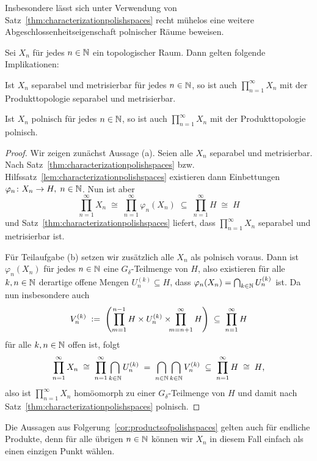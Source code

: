 \documentclass[../main/main.tex]{subfiles}
\begin{document}
	Insbesondere lässt sich unter Verwendung von Satz~\ref{thm:characterizationpolishspaces} recht mühelos eine weitere Abgeschlossenheitseigenschaft polnischer Räume beweisen.
	
	\begin{Folgerung}
		\label{cor:productsofpolishspaces}
		Sei $X_n$ für jedes $n \in \mathbb{N}$ ein topologischer Raum. Dann gelten folgende Implikationen:
		\begin{enumeratethm}
			\item Ist $X_n$ separabel und metrisierbar für jedes $n \in \mathbb{N}$, so ist auch $\prod_{n=1}^{\infty} X_n$ mit der Produkttopologie separabel und metrisierbar.
			\item Ist $X_n$ polnisch für jedes $n \in \mathbb{N}$, so ist auch $\prod_{n=1}^{\infty} X_n$ mit der Produkttopologie polnisch.
		\end{enumeratethm}
	\end{Folgerung}
	
	\begin{proof}
		Wir zeigen zunächst Aussage (a). Seien alle $X_n$ separabel und metrisierbar. Nach Satz~\ref{thm:characterizationpolishspaces} bzw. 
		Hilfssatz~\ref{lem:characterizationpolishspaces} existieren dann Einbettungen $\varphi_n \colon X_n \to H, \; n \in \mathbb{N}$. Nun ist aber 
		\[ \prod_{n=1}^{\infty} X_n \; \cong \; \prod_{n=1}^{\infty} \varphi_n(X_n) \; \subseteq \; \prod_{n=1}^{\infty} H \; \cong \; H \]
		und Satz~\ref{thm:characterizationpolishspaces} liefert, dass $\prod_{n=1}^{\infty} X_n$ separabel und metrisierbar ist.
		
		Für Teilaufgabe (b) setzen wir zusätzlich alle $X_n$ als polnisch voraus. Dann ist $\varphi_n(X_n)$ für jedes $n \in \mathbb{N}$ eine $G_{\delta}$-Teilmenge von $H$, also
		existieren für alle $k, n \in \mathbb{N}$ derartige offene Mengen $U_n^{(k)} \subseteq H$, dass $\varphi_n(X_n) = \bigcap_{k \in \mathbb{N}} U_n^{(k)}$ ist. Da nun insbesondere auch
		\[ V_n^{(k)} \; \vcentcolon = \; \left( \prod_{m=1}^{n-1} H \times U_n^{(k)} \times \!\!\! \prod_{m=n+1}^{\infty} H \right) \; \subseteq \; \prod_{n=1}^{\infty} H \]
		für alle $k, n \in \mathbb{N}$ offen ist, folgt
		\[ \prod_{n=1}^{\infty} X_n \; \cong \; \prod_{n=1}^{\infty} \bigcap_{k \in \mathbb{N}} U_n^{(k)} \; = \; \bigcap_{n \in \mathbb{N}} \bigcap_{k \in \mathbb{N}} V_n^{(k)} \; \subseteq \; \prod_{n=1}^{\infty} H \; \cong \; H \text{,} \]
		also ist $\prod_{n=1}^{\infty} X_n$ homöomorph zu einer $G_{\delta}$-Teilmenge von $H$ und damit nach Satz~\ref{thm:characterizationpolishspaces} polnisch.
	\end{proof}
	
	\begin{Bemerkung}
		Die Aussagen aus Folgerung~\ref{cor:productsofpolishspaces} gelten auch für endliche Produkte, denn für alle übrigen $n \in \mathbb{N}$ können wir $X_n$ in diesem Fall einfach als einen einzigen Punkt wählen.
	\end{Bemerkung}
	
\end{document}
